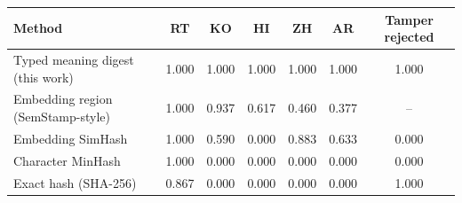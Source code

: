 \begin{tabular}{@{}lcccccc@{}}
\toprule
Method & RT & KO & HI & ZH & AR & Tamper rejected \\
\midrule
Typed meaning digest (this work) & 1.000 & 1.000 & 1.000 & 1.000 & 1.000 & 1.000 \\
Embedding region (SemStamp-style) & 1.000 & 0.937 & 0.617 & 0.460 & 0.377 & -- \\
Embedding SimHash & 1.000 & 0.590 & 0.000 & 0.883 & 0.633 & 0.000 \\
Character MinHash & 1.000 & 0.000 & 0.000 & 0.000 & 0.000 & 0.000 \\
Exact hash (SHA-256) & 0.867 & 0.000 & 0.000 & 0.000 & 0.000 & 1.000 \\
\bottomrule
\end{tabular}
